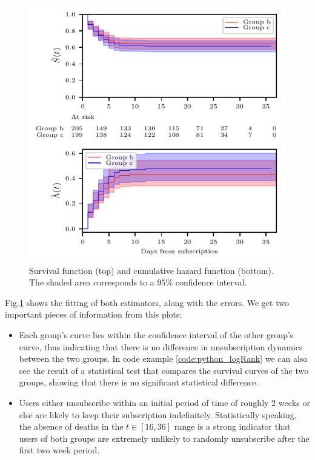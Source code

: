 \documentclass[paper=a4, fontsize=10pt]{report}
\begin{document}
\begin{figure}[h!]
\centering
\captionsetup{justification=centering}
\includegraphics[scale = 0.9]{survival.pdf}
\caption{Survival function (top) and cumulative hazard function (bottom). The shaded area corresponds to a $95\%$ confidence
interval.}
\label{fig:survival}
\end{figure}


Fig.\ref{fig:survival} shows the fitting of both estimators, along with the errors. We get two important pieces of information
from this plots:
\begin{itemize}
 \item Each group's curve lies within the confidence interval of the other group's curve, thus indicating that there is no difference in unsubscription dynamics between the two groups.
 In code example \ref{code:python_logRank} we can also see the result of a statistical test
that compares the survival curves of the two groups, showing that there is no significant statistical difference.

 \item  Users either unsubscribe within an initial period of time of roughly 2 weeks or else are likely to keep their subscription indefinitely. Statistically
speaking, the absence of deaths in the $t \in [16,36]$ range is a strong indicator that users of both groups are extremely unlikely to randomly
unsubscribe after the first two week period.
\end{itemize}
\end{document}
